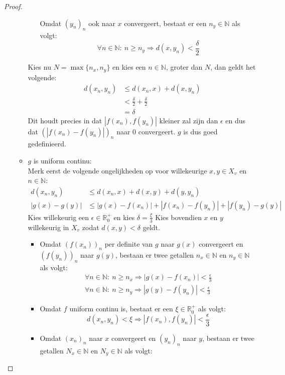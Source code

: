 \documentclass[main.tex]{subfiles}
\begin{document}
\begin{st}
\begin{proof}
\begin{itemize}
\begin{itemize}
\begin{itemize}
          Omdat $(y_{n})_{n}$ ook naar $x$ convergeert, bestaat er een $n_{y}\in\mathbb{N}$ als volgt:
          \[ \forall n\in\mathbb{N}:\ n \ge n_{y} \Rightarrow d(x,y_{n}) < \frac{\delta}{2} \]
        \end{itemize}
        Kies nu $N = \max\{ n_{x}, n_{y}\}$ en kies een $n\in\mathbb{N}$, groter dan $N$, dan geldt het volgende:
        \begin{align*}
          d(x_{n},y_{n})
          &\le d(x_{n},x) + d(x,y_{n})\\
          &< \frac{\delta}{2} + \frac{\delta}{2}\\
          &= \delta
        \end{align*}
        Dit houdt precies in dat $|f(x_{n}),f(y_{n})|$ kleiner zal zijn dan $\epsilon$ en dus dat $\left(|f(x_{n})-f(y_{n})|\right)_{n}$ naar $0$ convergeert.
        $g$ is dus goed gedefinieerd.
      \item $g$ is uniform continu:\\
        Merk eerst de volgende ongelijkheden op voor willekeurige $x,y\in X_{v}$ en $n\in\mathbb{N}$:
        \begin{align*}
          d(x_{n},y_{n}) &\le d(x_{n},x) + d(x,y) + d(y,y_{n})\\
          |g(x)-g(y)| &\le |g(x)-f(x_{n})| + |f(x_{n})-f(y_{n})| + |f(y_{n})-g(y)|
        \end{align*}
        Kies willekeurig een $\epsilon\in\mathbb{R}_{0}^{+}$ en kies $\delta = \frac{\xi}{3}$
        Kies bovendien $x$ en $y$ willekeurig in $X_{v}$ zodat $d(x,y)< \delta$ geldt.
        \begin{itemize}
        \item 
          Omdat $(f(x_{n}))_{n}$ per definite van $g$ naar $g(x)$ convergeert en $(f(y_{n}))_{n}$ naar $g(y)$, bestaan er twee getallen $n_{x}\in\mathbb{N}$ en $n_{y}\in\mathbb{N}$ als volgt:
          \begin{align*}
            \forall n\in\mathbb{N}:\ n\ge n_{x}\Rightarrow |g(x)-f(x_{n})| < \frac{\epsilon}{3}\\
            \forall n\in\mathbb{N}:\ n\ge n_{y}\Rightarrow |g(y)-f(y_{n})| < \frac{\epsilon}{3}
          \end{align*}
        \item Omdat $f$ uniform continu is, bestaat er een $\xi\in\mathbb{R}_{0}^{+}$ als volgt:
          \[ d(x_{n},y_{n}) < \xi \Rightarrow |f(x_{n}),f(y_{n})| < \frac{\epsilon}{3} \]
        \item Omdat $(x_{n})_{n}$ naar $x$ convergeert en $(y_{n})_{n}$ naar $y$, bestaan er twee getallen $N_{x}\in\mathbb{N}$ en $N_{y}\in\mathbb{N}$ als volgt:

\end{itemize}
\end{itemize}
\end{itemize}
\end{proof}
\end{st}
\end{document}
